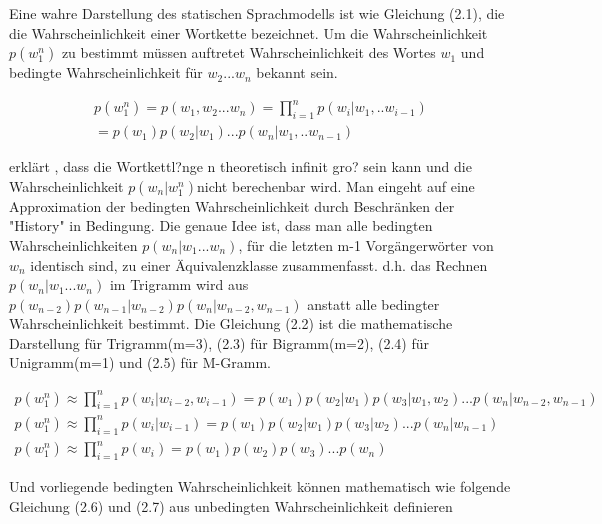 Eine wahre Darstellung des statischen Sprachmodells ist wie Gleichung (2.1), die die Wahrscheinlichkeit einer Wortkette bezeichnet. Um die Wahrscheinlichkeit $p(w_{1}^n)$ zu bestimmt m\"ussen auftretet Wahrscheinlichkeit des Wortes $w_{1}$ und bedingte Wahrscheinlichkeit f\"ur $w_{2}...w_{n}$ bekannt sein.

\begin{multline}
p(w_{1}^n) = p(w_{1},w_{2}...w_{n}) = \prod_{i=1}^n p(w_{i}|w_{1},..w_{i-1}) \\
= p(w_{1})p(w_{2}|w_{1})...p(w_{n}|w_{1},..w_{n-1})
\end{multline}

\cite{book_speech} erkl\"art , dass die Wortkettl?nge n theoretisch infinit gro? sein kann und die Wahrscheinlichkeit $p(w_{n}|w_{1}^n)$nicht berechenbar wird. Man eingeht auf eine Approximation der bedingten Wahrscheinlichkeit durch Beschr\"anken der "History" in Bedingung. Die genaue Idee ist, dass man alle bedingten Wahrscheinlichkeiten $p(w_{n}|w_{1}...w_{n})$, f\"ur die letzten m-1 Vorg\"angerw\"orter von $w_{n}$ identisch sind, zu einer \"Aquivalenzklasse zusammenfasst. d.h. das Rechnen $p(w_{n}|w_{1}...w_{n})$ im Trigramm wird aus $p(w_{n-2})p(w_{n-1}|w_{n-2})p(w_{n}|w_{n-2},w_{n-1})$ anstatt alle bedingter Wahrscheinlichkeit bestimmt. 
Die Gleichung (2.2) ist die mathematische Darstellung f\"ur Trigramm(m=3), (2.3) f\"ur Bigramm(m=2), (2.4) f\"ur Unigramm(m=1) und (2.5) f\"ur M-Gramm.

\begin{gather}
p(w_{1}^n) \approx \prod_{i=1}^n p(w_{i}|w_{i-2},w_{i-1})=p(w_{1})p(w_{2}|w_{1})p(w_{3}|w_{1},w_{2})...p(w_{n}|w_{n-2},w_{n-1}) \\
p(w_{1}^n) \approx \prod_{i=1}^n p(w_{i}|w_{i-1})=p(w_{1})p(w_{2}|w_{1})p(w_{3}|w_{2})...p(w_{n}|w_{n-1}) \\
p(w_{1}^n) \approx \prod_{i=1}^n p(w_{i})=p(w_{1})p(w_{2})p(w_{3})...p(w_{n})
\end{gather}

Und vorliegende bedingten Wahrscheinlichkeit k\"onnen mathematisch wie folgende Gleichung (2.6) und (2.7)  aus unbedingten Wahrscheinlichkeit definieren

\cite{ars_script}
\cite{int_MLE}
\cite{folie_script}
\cite{int_entropie}
